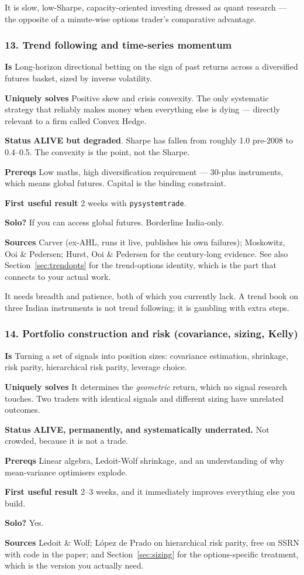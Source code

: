 \documentclass[11pt,a4paper]{article}
\newcommand{\alv}[1]{\textcolor{alive}{\textbf{#1}}}
\newcommand{\fitem}[1]{\par\smallskip\noindent\textbf{#1} }
\begin{document}
\begin{waste}
It is slow, low-Sharpe, capacity-oriented investing dressed as quant research ---
the opposite of a minute-wise options trader's comparative advantage.
\end{waste}

\subsubsection{13. Trend following and time-series momentum}
\fitem{Is}Long-horizon directional betting on the sign of past returns across a
diversified futures basket, sized by inverse volatility.
\fitem{Uniquely solves}Positive skew and crisis convexity. The only systematic
strategy that reliably makes money when everything else is dying --- directly
relevant to a firm called Convex Hedge.
\fitem{Status}\alv{ALIVE but degraded}. Sharpe has fallen from roughly 1.0
pre-2008 to 0.4--0.5. The convexity is the point, not the Sharpe.
\fitem{Prereqs}Low maths, high diversification requirement --- 30-plus
instruments, which means global futures. Capital is the binding constraint.
\fitem{First useful result}2 weeks with \texttt{pysystemtrade}.
\fitem{Solo?}If you can access global futures. Borderline India-only.
\fitem{Sources}Carver (ex-AHL, runs it live, publishes his own failures);
Moskowitz, Ooi \& Pedersen; Hurst, Ooi \& Pedersen for the century-long evidence.
See also Section~\ref{sec:trendopts} for the trend-options identity, which is the
part that connects to your actual work.

\begin{waste}
It needs breadth and patience, both of which you currently lack. A trend book on
three Indian instruments is not trend following; it is gambling with extra steps.
\end{waste}

\subsubsection{14. Portfolio construction and risk (covariance, sizing, Kelly)}
\fitem{Is}Turning a set of signals into position sizes: covariance estimation,
shrinkage, risk parity, hierarchical risk parity, leverage choice.
\fitem{Uniquely solves}It determines the \emph{geometric} return, which no signal
research touches. Two traders with identical signals and different sizing have
unrelated outcomes.
\fitem{Status}\alv{ALIVE, permanently, and systematically underrated.} Not
crowded, because it is not a trade.
\fitem{Prereqs}Linear algebra, Ledoit-Wolf shrinkage, and an understanding of why
mean-variance optimisers explode.
\fitem{First useful result}2--3 weeks, and it immediately improves everything
else you build.
\fitem{Solo?}Yes.
\fitem{Sources}Ledoit \& Wolf; L\'opez de Prado on hierarchical risk parity, free
on SSRN with code in the paper; and Section~\ref{sec:sizing} for the
options-specific treatment, which is the version you actually need.
\end{document}
